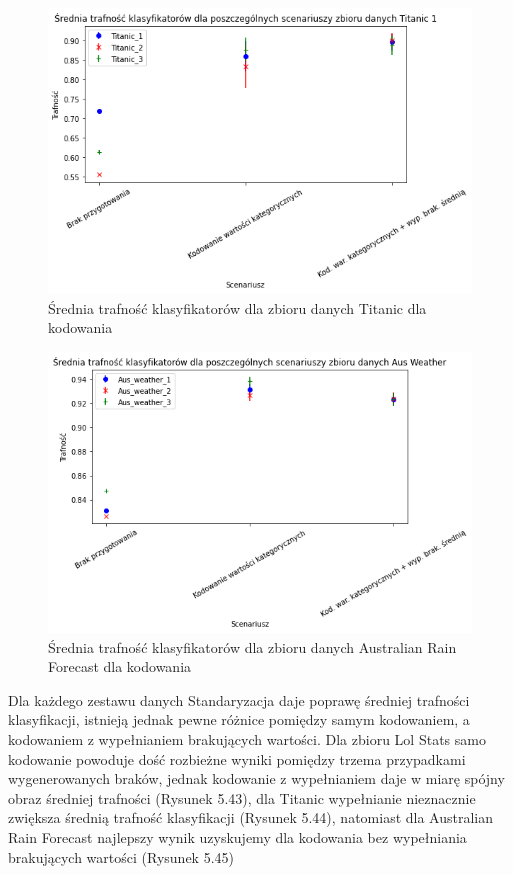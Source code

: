 \documentclass{book}
\begin{document}
\begin{figure}[H]
    \centerline{\includegraphics[scale=0.8]{Titanic_Avg_Kodowanie}}
    \centering
    \caption{Średnia trafność klasyfikatorów dla zbioru danych Titanic 
    dla kodowania}
    \end{figure}

\begin{figure}[H]
    \centerline{\includegraphics[scale=0.8]{Aus_Weather_Avg_Kodowanie}}
    \centering
    \caption{Średnia trafność klasyfikatorów dla zbioru danych Australian Rain Forecast 
    dla kodowania}
    \end{figure}

    Dla każdego zestawu danych Standaryzacja daje poprawę 
    średniej trafności klasyfikacji, istnieją jednak pewne 
    różnice pomiędzy samym kodowaniem, a kodowaniem z 
    wypełnianiem brakujących wartości. Dla zbioru Lol 
    Stats samo kodowanie powoduje dość rozbieżne wyniki 
    pomiędzy trzema przypadkami wygenerowanych braków, 
    jednak kodowanie z wypełnianiem daje w miarę spójny 
    obraz średniej trafności (Rysunek 5.43), dla Titanic 
    wypełnianie nieznacznie zwiększa średnią trafność 
    klasyfikacji (Rysunek 5.44), natomiast dla Australian Rain Forecast
    najlepszy wynik uzyskujemy dla kodowania bez wypełniania brakujących wartości (Rysunek 5.45)
\end{document}
